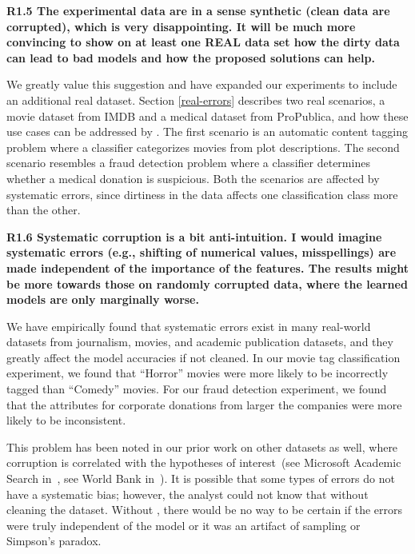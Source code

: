 \vspace{0.5em}

\noindent\textbf{R1.5 The experimental data are in a sense synthetic (clean data are corrupted), which is very disappointing. It will be much more convincing to show on at least one REAL data set how the dirty data can lead to bad models and how the proposed solutions can help.}

\noindent We greatly value this suggestion and have expanded our experiments to include an additional real dataset.
Section \ref{real-errors} describes two real scenarios, a movie dataset from IMDB and a medical dataset from ProPublica, and how these use cases can be addressed by \sys.
The first scenario is an automatic content tagging problem where a classifier categorizes movies from plot descriptions.
The second scenario resembles a fraud detection problem where a classifier determines whether a medical donation is suspicious.
Both the scenarios are affected by systematic errors, since dirtiness in the data affects one classification class more than the other.

\vspace{0.5em}

\noindent\textbf{R1.6 Systematic corruption is a bit anti-intuition. I would imagine systematic errors (e.g., shifting of numerical values, misspellings) are made independent of the importance of the features. The results might be more towards those on randomly corrupted data, where the learned models are only marginally worse.}

\noindent  We have empirically found that systematic errors exist in many real-world datasets from journalism, movies, and academic publication datasets, and they greatly affect the model accuracies if not cleaned. In our movie tag classification experiment, we found that ``Horror'' movies were more likely to be incorrectly tagged than ``Comedy'' movies.
For our fraud detection experiment, we found that the attributes for corporate donations from larger the companies were more likely to be inconsistent.

This problem has been noted in our prior work on other datasets as well, where corruption is correlated with the hypotheses of interest~(see Microsoft Academic Search in~\cite{wang1999sample}, see World Bank in~\cite{activecleanarxiv}). It is possible that some types of errors do not have a systematic bias; however, the analyst could not know that without cleaning the dataset.
Without \sys, there would be no way to be certain if the errors were truly independent of the model or it was an artifact of sampling or Simpson's paradox.


